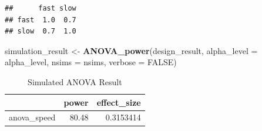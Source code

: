 \documentclass[]{book}
\newenvironment{Shaded}{\begin{snugshade}}{\end{snugshade}}
\newcommand{\DataTypeTok}[1]{\textcolor[rgb]{0.13,0.29,0.53}{#1}}
\newcommand{\FloatTok}[1]{\textcolor[rgb]{0.00,0.00,0.81}{#1}}
\newcommand{\KeywordTok}[1]{\textcolor[rgb]{0.13,0.29,0.53}{\textbf{#1}}}
\newcommand{\NormalTok}[1]{#1}
\newcommand{\OperatorTok}[1]{\textcolor[rgb]{0.81,0.36,0.00}{\textbf{#1}}}
\newcommand{\OtherTok}[1]{\textcolor[rgb]{0.56,0.35,0.01}{#1}}
\newcommand{\StringTok}[1]{\textcolor[rgb]{0.31,0.60,0.02}{#1}}
\begin{document}
\begin{Shaded}
\end{Shaded}

\begin{verbatim}
##      fast slow
## fast  1.0  0.7
## slow  0.7  1.0
\end{verbatim}

\begin{Shaded}
\begin{Highlighting}[]
\NormalTok{simulation_result <-}\StringTok{ }\KeywordTok{ANOVA_power}\NormalTok{(design_result, }
                                 \DataTypeTok{alpha_level =}\NormalTok{ alpha_level, }
                                 \DataTypeTok{nsims =}\NormalTok{ nsims,}
                                 \DataTypeTok{verbose =} \OtherTok{FALSE}\NormalTok{)}
\end{Highlighting}
\end{Shaded}

\begin{table}[t]

\caption{\label{tab:unnamed-chunk-101}Simulated ANOVA Result}
\centering
\begin{tabular}{l|r|r}
\hline
  & power & effect\_size\\
\hline
anova\_speed & 80.48 & 0.3153414\\
\hline
\end{tabular}
\end{table}
\end{document}
